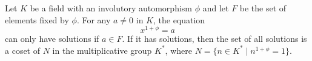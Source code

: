Let $K$ be a field with an involutory automorphism $\phi$ and let $F$ be the set of elements fixed by $\phi$. For any $a \neq 0$ in $K$, the equation
$$x^{1+\phi} = a$$
can only have solutions if $a \in F$. If it has solutions, then the set of all solutions is a coset of $N$ in the multiplicative group $K^*$, where $N = \{ n \in K^* \mid n^{1+\phi} = 1 \}$.
